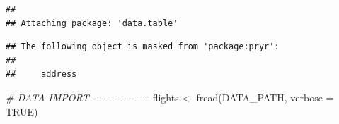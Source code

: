 \documentclass[
  12pt,
]{style/krantz}
\newenvironment{Shaded}{\begin{snugshade}}{\end{snugshade}}
\newcommand{\AttributeTok}[1]{\textcolor[rgb]{0.77,0.63,0.00}{#1}}
\newcommand{\CommentTok}[1]{\textcolor[rgb]{0.56,0.35,0.01}{\textit{#1}}}
\newcommand{\ConstantTok}[1]{\textcolor[rgb]{0.00,0.00,0.00}{#1}}
\newcommand{\FunctionTok}[1]{\textcolor[rgb]{0.00,0.00,0.00}{#1}}
\newcommand{\NormalTok}[1]{#1}
\newcommand{\OtherTok}[1]{\textcolor[rgb]{0.56,0.35,0.01}{#1}}
\begin{document}
\begin{verbatim}
## 
## Attaching package: 'data.table'
\end{verbatim}

\begin{verbatim}
## The following object is masked from 'package:pryr':
## 
##     address
\end{verbatim}

\begin{Shaded}
\begin{Highlighting}[]
\CommentTok{\# DATA IMPORT {-}{-}{-}{-}{-}{-}{-}{-}{-}{-}{-}{-}{-}{-}{-}{-}}
\NormalTok{flights }\OtherTok{\textless{}{-}} \FunctionTok{fread}\NormalTok{(DATA\_PATH, }\AttributeTok{verbose =} \ConstantTok{TRUE}\NormalTok{)}
\end{Highlighting}
\end{Shaded}
\end{document}
